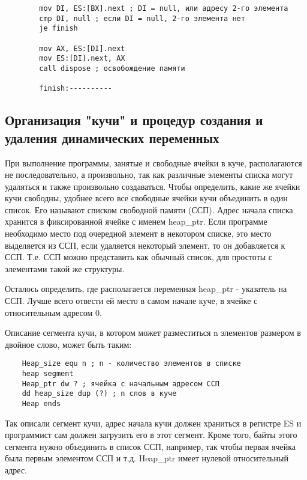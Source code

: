 \begin{enumerate}
\begin{verbatim}
        mov DI, ES:[BX].next ; DI = null, или адресу 2-го элемента
        cmp DI, null ; если DI = null, 2-го элемента нет
        je finish

        mov AX, ES:[DI].next
        mov ES:[DI].next, AX
        call dispose ; освобождение памяти
        
        finish:----------
    \end{verbatim}
    \begin{figure}[H]
    \end{figure}
\end{enumerate}

\subsection{Организация "кучи" и процедур создания и удаления динамических переменных}

При выполнение программы, занятые и свободные ячейки в куче, располагаются не последовательно, а произвольно, так как различные элементы списка могут удаляться и также произвольно создаваться.
Чтобы определить, какие же ячейки кучи свободны, удобнее всего все свободные ячейки кучи объединить в один список. Его называют списком свободной памяти (ССП). Адрес начала списка хранится в фиксированной ячейке с именем heap_ptr.
Если программе необходимо место под очередной элемент в некотором списке, это место выделяется из ССП, если удаляется некоторый элемент, то он добавляется к ССП. Т.е. ССП можно представить как обычный список, для простоты с элементами такой же структуры.
\begin{figure}[H]
\end{figure}

Осталось определить, где располагается переменная heap_ptr - указатель на ССП. Лучше всего отвести ей место в самом начале куче, в ячейке с относительным адресом 0.

Описание сегмента кучи, в котором может разместиться n элементов размером в двойное слово, может быть таким:
\begin{verbatim}
    Heap_size equ n ; n - количество элементов в списке
    heap segment
    Heap_ptr dw ? ; ячейка с начальным адресом ССП
    dd heap_size dup (?) ; n слов в куче
    Heap ends
\end{verbatim}

Так описали сегмент кучи, адрес начала кучи должен храниться в регистре ES и программист сам должен загрузить его в этот сегмент. Кроме того, байты этого сегмента нужно объединить в список ССП, например, так чтобы первая ячейка была первым элементом ССП и т.д. Heap_ptr имеет нулевой относительный адрес.
\begin{figure}[H]
\end{figure}

